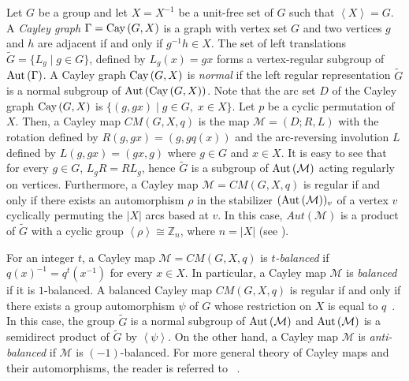 \documentclass[12pt]{amsart}
\begin{document}
Let $G$ be a group and let $X=X^{-1}$ be a unit-free set of $G$
such that $\left< X \right> = G$. A \emph{Cayley graph}
$\Gamma={\mbox{\rm Cay\,}}(G,X)$ is a graph with vertex set $G$ and two
vertices $g$ and $h$ are adjacent if and only if $g^{-1}h\in X$.
The set of left translations $\tilde G =\{L_g \mid g\in G \}$,
defined by $L_g(x)=gx$ forms a vertex-regular subgroup
of ${\mbox{\rm Aut\,}}(\Gamma)$.  A Cayley graph ${\mbox{\rm Cay\,}}(G,X)$ is \emph{normal} if the left regular
representation $\tilde{G}$ is a normal subgroup of ${\mbox{\rm Aut\,}}({\mbox{\rm Cay\,}}(G,X))$.
Note that the arc set $D$ of the Cayley graph ${\mbox{\rm Cay\,}}(G,X)$ is
$\{(g, gx) \mid g\in G,\;x \in X \}$. Let $p$ be a cyclic
permutation of $X$. Then, a Cayley map $CM(G,X,q)$ is the map
$\mathcal{ M}=(D;R,L)$ with the rotation defined by
$R(g,gx)=(g,gq(x))$ and the arc-reversing involution $L$ defined
by $L(g, gx) = (gx, g)$ where $g \in G$ and $x \in X$. It is easy
to see that for every $g \in G$, $L_g R=R L_g$, hence $\tilde G$
is a subgroup of  ${\mbox{\rm Aut\,}}(\mathcal{M})$ acting regularly on
vertices. Furthermore, a Cayley map $\mathcal{ M}=CM(G,X,q)$ is
regular if and only if there exists an automorphism $\rho$ in the
stabilizer $({\mbox{\rm Aut\,}}(\mathcal{M}))_v$ of a vertex $v$ cyclically
permuting the $|X|$ arcs based at $v$.  In this case,
$Aut(\mathcal{M})$ is a product of $\tilde G$ with a cyclic group
$\left< \rho \right> \cong \mathbb{Z}_n$, where $n=|X|$ (see
\cite{JA1,JAS}).

For an integer $t$, a Cayley map $\mathcal{ M} = CM(G,X,q)$ is \emph{
$t$-balanced} if $q(x)^{-1}=q^{t}(x^{-1})$ for every $x \in X$. In particular, a Cayley map $\mathcal{M}$ is
\emph{balanced} if it is $1$-balanced. A balanced Cayley map
$CM(G,X,q)$ is regular if and only if there exists a group
automorphism $\psi$ of $G$ whose restriction on $X$ is equal to
$q$~\cite{SS1}. In this case, the group $\tilde G$ is a normal subgroup of
${\mbox{\rm Aut\,}}(\mathcal{ M})$ and ${\mbox{\rm Aut\,}}(\mathcal{ M})$ is a semidirect product of
$\tilde G$ by $\left< \psi \right>$. On the other hand, a Cayley map $\mathcal{M}$
is \emph{anti-balanced} if $\mathcal{M}$ is $(-1)$-balanced. For more general theory of Cayley
maps and their automorphisms, the reader is referred to
~\cite{JA1, JAS}.
\end{document}
